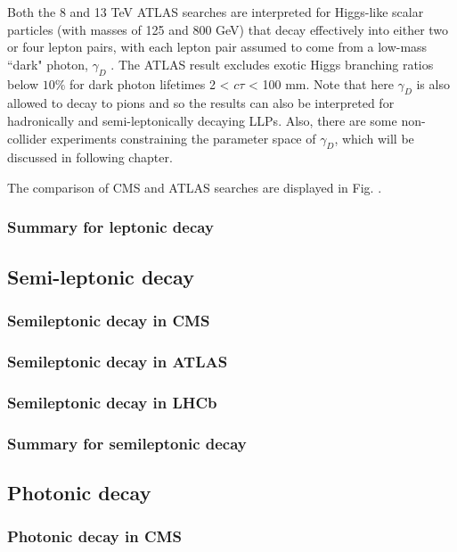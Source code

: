 Both the 8 and 13 TeV ATLAS searches are interpreted for Higgs-like scalar particles (with masses of 125 and 800 GeV) that decay effectively into either two or four lepton pairs, with each lepton pair assumed to come from a low-mass “dark" photon, $\gamma_D$ . The ATLAS result excludes exotic Higgs branching ratios below $10\%$ for dark photon lifetimes 2 < $c\tau$ < 100 mm. Note that here $\gamma_D$ is also allowed to decay to pions and so the results can also be interpreted for hadronically and semi-leptonically decaying LLPs. Also, there are some non-collider experiments constraining the parameter space of $\gamma_D$, which will be discussed in following chapter.

The comparison of CMS and ATLAS searches are displayed in Fig. \cite{fig:lepton-jet}.


\subsubsection{Summary for leptonic decay}



\subsection{Semi-leptonic decay}

\subsubsection{Semileptonic decay in CMS}

\subsubsection{Semileptonic decay in ATLAS}

\subsubsection{Semileptonic decay in LHCb}

\subsubsection{Summary for semileptonic decay}

\subsection{Photonic decay}

\subsubsection{Photonic decay in CMS}

